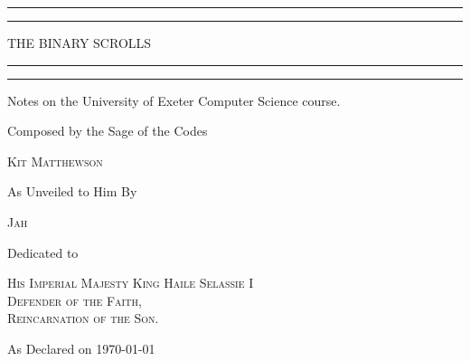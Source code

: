 \documentclass[twoside]{report}
\begin{document}
\begin{titlepage}

    \centering
    \vspace*{\baselineskip}

    \rule{\textwidth}{1.6pt}\vspace*{-\baselineskip}\vspace*{2pt}
    \rule{\textwidth}{0.4pt}

    \vspace{0.75\baselineskip}

    {\scshape\LARGE THE BINARY SCROLLS}

    \rule{\textwidth}{0.4pt}\vspace*{-\baselineskip}\vspace{3.2pt}
    \rule{\textwidth}{1.6pt}

    \vspace{2\baselineskip}

    Notes on the University of Exeter Computer Science course.

    \vspace*{5\baselineskip}

    Composed by the Sage of the Codes

    \vspace{0.5\baselineskip}

    {\scshape\Large Kit Matthewson}

    \vspace{1\baselineskip}

    As Unveiled to Him By

    \vspace{0.5\baselineskip}

    {\scshape\Large Jah}

    \vspace{10\baselineskip}

    Dedicated to

        {\scshape\normalsize His Imperial Majesty King Haile Selassie I\\Defender of the Faith,\\Reincarnation of the Son.}

    \vspace{12\baselineskip}

    As Declared on \today

\end{titlepage}

\tableofcontents





\end{document}
